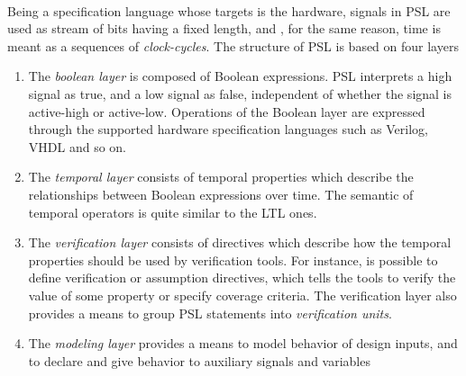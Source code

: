 \paragraph{} Being a specification language whose targets is the hardware, signals in PSL are used as stream of bits having a fixed length, and , for the same reason, time is meant as a sequences of \textit{clock-cycles}. The structure of PSL is based on four layers
\begin{enumerate}[label={--}]
\item The \textit{boolean layer} is composed of Boolean expressions. PSL interprets a high signal as true, and a low signal as false, independent of whether the signal is active-high or active-low. Operations of the Boolean layer are expressed through the supported hardware specification languages such as Verilog, VHDL and so on.
\item The \textit{temporal layer} consists of temporal properties which describe the relationships between Boolean expressions over time. The semantic of temporal operators is quite similar to the LTL ones.
\item The \textit{verification layer} consists of directives which describe how the temporal properties should be used by verification tools. For instance, is possible to define verification or assumption directives, which tells the tools to verify the value of some property or specify coverage criteria. The verification layer also provides a means to group PSL statements into \textit{verification units}.
\item The \textit{modeling layer} provides a means to model behavior of design inputs, and to declare and give behavior to auxiliary signals and variables
\end{enumerate}

